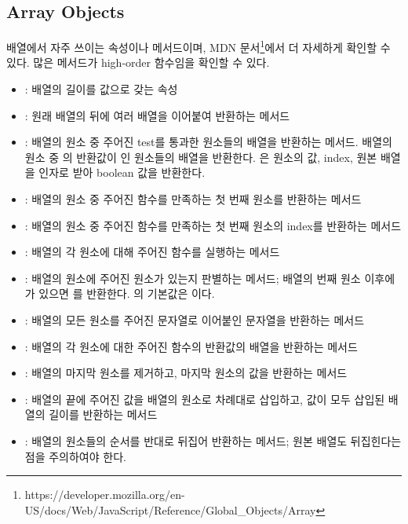 \subsection*{Array Objects}

배열에서 자주 쓰이는 속성이나 메서드이며, MDN 문서\footnote{https://developer.mozilla.org/en-US/docs/Web/JavaScript/Reference/Global\_Objects/Array}에서 더 자세하게 확인할 수 있다. 많은 메서드가 high-order 함수임을 확인할 수 있다.

\begin{itemize}
    \item {}: 배열의 길이를 값으로 갖는 속성
    \item {}: 원래 배열의 뒤에 여러 배열을 이어붙여 반환하는 메서드
    \item {}: 배열의 원소 중 주어진 test를 통과한 원소들의 배열을 반환하는 메서드. 배열의 원소 중 의 반환값이 인 원소들의 배열을 반환한다. 은 원소의 값, index, 원본 배열을 인자로 받아 boolean 값을 반환한다.
    \item {}: 배열의 원소 중 주어진 함수를 만족하는 첫 번째 원소를 반환하는 메서드
    \item {}: 배열의 원소 중 주어진 함수를 만족하는 첫 번째 원소의 index를 반환하는 메서드
    \item {}: 배열의 각 원소에 대해 주어진 함수를 실행하는 메서드
    \item {}: 배열의 원소에 주어진 원소가 있는지 판별하는 메서드; 배열의 번째 원소 이후에 가 있으면 를 반환한다. 의 기본값은 이다.
    \item {}: 배열의 모든 원소를 주어진 문자열로 이어붙인 문자열을 반환하는 메서드
    \item {}: 배열의 각 원소에 대한 주어진 함수의 반환값의 배열을 반환하는 메서드
    \item {}: 배열의 마지막 원소를 제거하고, 마지막 원소의 값을 반환하는 메서드
    \item {}: 배열의 끝에 주어진 값을 배열의 원소로 차례대로 삽입하고, 값이 모두 삽입된 배열의 길이를 반환하는 메서드
    \item {}: 배열의 원소들의 순서를 반대로 뒤집어 반환하는 메서드; 원본 배열도 뒤집힌다는 점을 주의하여야 한다.

\end{itemize}
